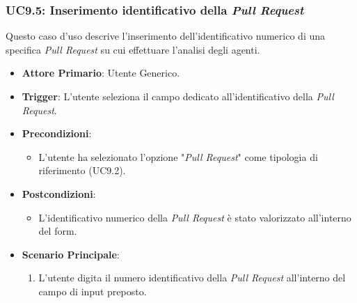 \documentclass[12pt, a4paper]{article}
\begin{document}
\subsubsection{UC9.5: Inserimento identificativo della \textit{Pull Request}}\label{uc:9.5}
Questo caso d'uso descrive l'inserimento dell'identificativo numerico di una specifica \textit{Pull Request} su cui effettuare l'analisi degli agenti.
\begin{itemize}
    \item \textbf{Attore Primario}: Utente Generico.
    \item \textbf{Trigger}: L'utente seleziona il campo dedicato all'identificativo della \textit{Pull Request}.
    \item \textbf{Precondizioni}:\begin{itemize}\item L'utente ha selezionato l'opzione "\textit{Pull Request}" come tipologia di riferimento (UC9.2).\end{itemize}
    \item \textbf{Postcondizioni}:\begin{itemize}\item L'identificativo numerico della \textit{Pull Request} è stato valorizzato all'interno del form.\end{itemize}
    \item \textbf{Scenario Principale}:
    \begin{enumerate}
        \item L'utente digita il numero identificativo della \textit{Pull Request} all'interno del campo di input preposto.
    \end{enumerate}
\end{itemize}
\end{document}
